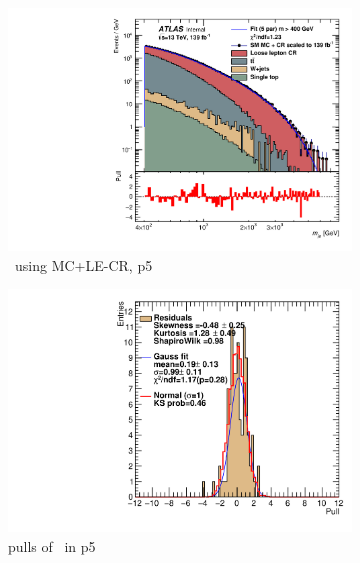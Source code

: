\begin{figure}[H]
\begin{subfigure}[h]{0.38\linewidth}
    \includegraphics[scale=0.3]{figs/ch6/fit/variable_nosmooth/p5/10PB/output_SMMCplusCR_Mje_p5.pdf}%
     \caption{\mje \ using MC+LE-CR, p5}
     \end{subfigure}
     \hfill
    \begin{subfigure}[h]{0.4\linewidth}
    \includegraphics[scale=0.32]{figs/ch6/fit/variable_nosmooth/p5/10PB/pull_SMMCplusCR_Mje_p5.pdf}%
    \caption{pulls of \mje \ in p5}
    \end{subfigure}
    \hfill
    \begin{subfigure}[h]{0.38\linewidth}

\end{subfigure}
\end{figure}
